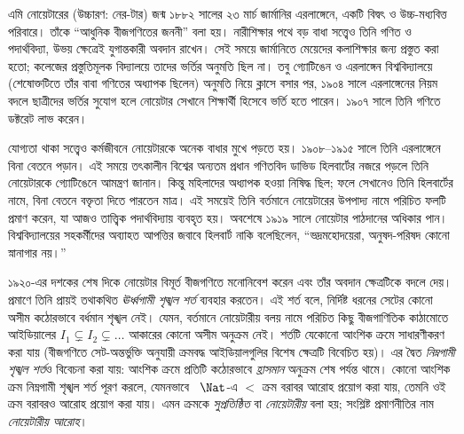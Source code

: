 \documentclass[../../../include/open-logic-section]{subfiles}
\begin{document}



এমি নোয়েটারের (উচ্চারণ: \textsc{নের}-টার)
জন্ম ১৮৮২ সালের ২৩ মার্চ জার্মানির এরলাঙ্গেনে,
একটি বিদ্বৎ ও উচ্চ-মধ্যবিত্ত পরিবারে। তাঁকে
“আধুনিক বীজগণিতের জননী” বলা হয়। নারীশিক্ষার
পথে বড় বাধা সত্ত্বেও তিনি গণিত ও পদার্থবিদ্যা,
উভয় ক্ষেত্রেই যুগান্তকারী অবদান রাখেন। সেই সময়ে
জার্মানিতে মেয়েদের কলাশিক্ষার জন্য প্রস্তুত করা
হতো; কলেজের প্রস্তুতিমূলক বিদ্যালয়ে তাদের
ভর্তির অনুমতি ছিল না। তবু গ্যোটিঙেন ও এরলাঙ্গেন
বিশ্ববিদ্যালয়ে (শেষোক্তটিতে তাঁর বাবা গণিতের
অধ্যাপক ছিলেন) অনুমতি নিয়ে ক্লাসে বসার পর,
১৯০৪ সালে এরলাঙ্গেনের নিয়ম বদলে ছাত্রীদের
ভর্তির সুযোগ হলে নোয়েটার সেখানে শিক্ষার্থী
হিসেবে ভর্তি হতে পারেন। ১৯০৭ সালে তিনি
গণিতে ডক্টরেট লাভ করেন।

যোগ্যতা থাকা সত্ত্বেও কর্মজীবনে নোয়েটারকে অনেক
বাধার মুখে পড়তে হয়। ১৯০৮--১৯১৫ সালে তিনি
এরলাঙ্গেনে বিনা বেতনে পড়ান। এই সময়ে তৎকালীন
বিশ্বের অন্যতম প্রধান গণিতবিদ ডাভিড হিলবার্টের
নজরে পড়লে তিনি নোয়েটারকে গ্যোটিঙেনে আমন্ত্রণ
জানান। কিন্তু মহিলাদের অধ্যাপক হওয়া নিষিদ্ধ
ছিল; ফলে সেখানেও তিনি হিলবার্টের নামে, বিনা
বেতনে বক্তৃতা দিতে পারতেন মাত্র। এই সময়েই
তিনি বর্তমানে নোয়েটারের উপপাদ্য নামে পরিচিত
ফলটি প্রমাণ করেন, যা আজও তাত্ত্বিক পদার্থবিদ্যায়
ব্যবহৃত হয়। অবশেষে ১৯১৯ সালে নোয়েটার
পাঠদানের অধিকার পান। বিশ্ববিদ্যালয়ের
সহকর্মীদের অব্যাহত আপত্তির জবাবে হিলবার্ট
নাকি বলেছিলেন, “ভদ্রমহোদয়েরা, অনুষদ-পরিষদ
কোনো স্নানাগার নয়।”

১৯২০-এর দশকের শেষ দিকে নোয়েটার বিমূর্ত
বীজগণিতে মনোনিবেশ করেন এবং তাঁর অবদান
ক্ষেত্রটিকে বদলে দেয়। প্রমাণে তিনি প্রায়ই
তথাকথিত \emph{ঊর্ধ্বগামী শৃঙ্খল শর্ত} ব্যবহার
করতেন। এই শর্ত বলে, নির্দিষ্ট ধরনের সেটের
কোনো অসীম কঠোরভাবে বর্ধমান শৃঙ্খল নেই।
যেমন, বর্তমানে নোয়েটারীয় বলয় নামে পরিচিত
কিছু বীজগাণিতিক কাঠামোতে আইডিয়ালের
$I_1 \subsetneq I_2 \subsetneq \dots$ আকারের
কোনো অসীম অনুক্রম নেই। শর্তটি যেকোনো আংশিক
ক্রমে সাধারণীকরণ করা যায় (বীজগণিতে
সেট-অন্তর্ভুক্তি অনুযায়ী ক্রমবদ্ধ আইডিয়ালগুলির
বিশেষ ক্ষেত্রটি বিবেচিত হয়)। এর দ্বৈত
\emph{নিম্নগামী শৃঙ্খল শর্ত}ও বিবেচনা করা যায়:
আংশিক ক্রমে প্রতিটি কঠোরভাবে \emph{হ্রাসমান}
অনুক্রম শেষ পর্যন্ত থামে। কোনো আংশিক ক্রম
নিম্নগামী শৃঙ্খল শর্ত পূরণ করলে, যেমনভাবে
~$\Nat$-এ $<$ ক্রম বরাবর আরোহ প্রয়োগ করা
যায়, তেমনি ওই ক্রম বরাবরও আরোহ প্রয়োগ
করা যায়। এমন ক্রমকে \emph{সুপ্রতিষ্ঠিত}
বা \emph{নোয়েটারীয়} বলা হয়; সংশ্লিষ্ট
প্রমাণনীতির নাম \emph{নোয়েটারীয় আরোহ}।
\end{document}
